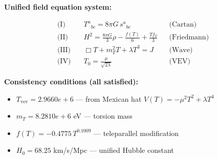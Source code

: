 
\textbf{Unified field equation system:}

\begin{align}
  \text{(I)} \quad & T^a{}_{bc} = 8\pi G \, s^a{}_{bc} && \text{(Cartan)} \\
  \text{(II)} \quad & H^2 = \frac{8\pi G}{3}\rho - \frac{f(T)}{6} + \frac{Tf_T}{3} && \text{(Friedmann)} \\
  \text{(III)} \quad & \Box T + m_T^2 T + \lambda T^3 = J && \text{(Wave)} \\
  \text{(IV)} \quad & T_0 = \frac{\mu}{\sqrt{2\lambda}} && \text{(VEV)}
\end{align}

\textbf{Consistency conditions (all satisfied):}
\begin{itemize}
  \item $T_{\text{vev}} = 2.9660e+6$ — from Mexican hat $V(T) = -\mu^2 T^2 + \lambda T^4$
  \item $m_T = 8.2810e+6$ eV — torsion mass
  \item $f(T) = -0.4775 \, T^{0.1009}$ — teleparallel modification
  \item $H_0 = 68.25$ km/s/Mpc — unified Hubble constant
\end{itemize}